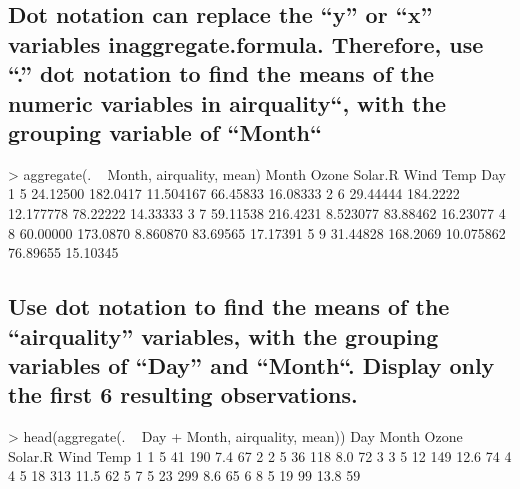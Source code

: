 \documentclass[a4paper,11pt]{article}
\begin{document}
\subsection{Dot notation can replace the “y” or “x” variables inaggregate.formula. Therefore, use “.” dot notation to find the means of the numeric variables in airquality“, with the grouping variable of “Month“}
\begin{rcode}
> aggregate(. ~ Month, airquality, mean)
  Month    Ozone  Solar.R      Wind     Temp      Day
1     5 24.12500 182.0417 11.504167 66.45833 16.08333
2     6 29.44444 184.2222 12.177778 78.22222 14.33333
3     7 59.11538 216.4231  8.523077 83.88462 16.23077
4     8 60.00000 173.0870  8.860870 83.69565 17.17391
5     9 31.44828 168.2069 10.075862 76.89655 15.10345
\end{rcode}

\subsection{Use dot notation to find the means of the “airquality” variables, with the grouping variables of “Day” and “Month“. Display only the first 6 resulting observations.}

\begin{rcode}
> head(aggregate(. ~ Day + Month, airquality, mean))
  Day Month Ozone Solar.R Wind Temp
1   1     5    41     190  7.4   67
2   2     5    36     118  8.0   72
3   3     5    12     149 12.6   74
4   4     5    18     313 11.5   62
5   7     5    23     299  8.6   65
6   8     5    19      99 13.8   59
\end{rcode}
\end{document}

